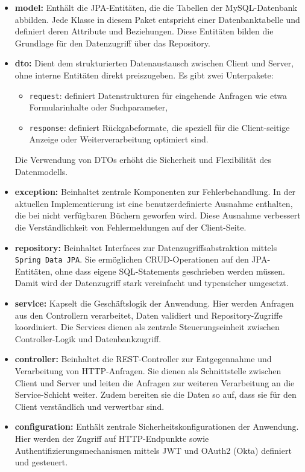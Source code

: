 \begin{itemize}
	\item \textbf{model:} Enthält die JPA-Entitäten, die die Tabellen der MySQL-Datenbank abbilden. Jede Klasse in diesem Paket entspricht einer Datenbanktabelle und definiert deren Attribute und Beziehungen. Diese Entitäten bilden die Grundlage für den Datenzugriff über das Repository.
	
	\item \textbf{dto:} Dient dem strukturierten Datenaustausch zwischen Client und Server, ohne interne Entitäten direkt preiszugeben. Es gibt zwei Unterpakete:
	\begin{itemize}
		\item \texttt{request}: definiert Datenstrukturen für eingehende Anfragen wie etwa Formularinhalte oder Suchparameter,
		\item \texttt{response}: definiert Rückgabeformate, die speziell für die Client-seitige Anzeige oder Weiterverarbeitung optimiert sind.
	\end{itemize}
	Die Verwendung von DTOs erhöht die Sicherheit und Flexibilität des Datenmodells.
	
	\item \textbf{exception:} Beinhaltet zentrale Komponenten zur Fehlerbehandlung. In der aktuellen Implementierung ist eine benutzerdefinierte Ausnahme enthalten, die bei nicht verfügbaren Büchern geworfen wird. Diese Ausnahme verbessert die Verständlichkeit von Fehlermeldungen auf der Client-Seite.
	
	\item \textbf{repository:} Beinhaltet Interfaces zur Datenzugriffsabstraktion mittels \texttt{Spring Data JPA}. Sie ermöglichen CRUD-Operationen auf den JPA-Entitäten, ohne dass eigene SQL-Statements geschrieben werden müssen. Damit wird der Datenzugriff stark vereinfacht und typensicher umgesetzt. 
	
	\item \textbf{service:} Kapselt die Geschäftslogik der Anwendung. Hier werden Anfragen aus den Controllern verarbeitet, Daten validiert und Repository-Zugriffe koordiniert. Die Services dienen als zentrale Steuerungseinheit zwischen Controller-Logik und Datenbankzugriff. 
	
	\item \textbf{controller:} Beinhaltet die REST-Controller zur Entgegennahme und Verarbeitung von HTTP-Anfragen. Sie dienen als Schnittstelle zwischen Client und Server und leiten die Anfragen zur weiteren Verarbeitung an die Service-Schicht weiter. Zudem bereiten sie die Daten so auf, dass sie für den Client verständlich und verwertbar sind.
	
	\item \textbf{configuration:} Enthält zentrale Sicherheitskonfigurationen der Anwendung. Hier werden der Zugriff auf HTTP-Endpunkte sowie Authentifizierungsmechanismen mittels JWT und OAuth2 (Okta) definiert und gesteuert.
\end{itemize}

